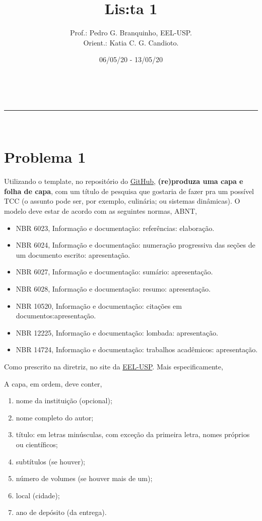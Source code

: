 \documentclass[a4paper,11pt]{abntex2}
\makeatletter
\newcommand{\linia}{\rule{\linewidth}{0.5pt}}
\theoremstyle{mytheor}
\renewcommand{\maketitle}{
  \begin{center}
    \vspace{4ex}
    { {\fontsize{40}{40}\selectfont \textfrak{\@title}} }
    \vspace{2ex}
    \\
    \linia\\
    \@author \hfill \@date
    \vspace{6ex}
  \end{center}
}
\makeatother
\begin{document}
  \title{Lis:ta 1}

  \author{\indent  Prof.: Pedro G. Branquinho, EEL-USP. \\
    Orient.: Katia C. G. Candioto.}

  \date{06/05/20 - 13/05/20}

  \maketitle

  \section*{Problema 1}

  Utilizando o template, no repositório do
  \href{https://github.com/26-55-87-BuddhiLW/MC-LaTeX/tree/master/Exemplos/ArquivosCurso/ModRelatCient}{GitHub},
  \textbf{(re)produza uma capa e folha de capa}, com um título de pesquisa que gostaria de fazer
  pra um possível TCC (o assunto pode ser, por exemplo, culinária; ou
  sistemas dinâmicas).  O modelo deve estar de acordo com as
  seguintes normas, ABNT,

  \begin{itemize}[noitemsep]

  \item NBR 6023, Informação e documentação: referências: elaboração.
  \item NBR 6024, Informação e documentação: numeração progressiva das seções de um documento escrito: apresentação.
  \item NBR 6027, Informação e documentação: sumário: apresentação.
  \item NBR 6028, Informação e documentação: resumo: apresentação.
  \item NBR 10520, Informação e documentação: citações em documentos:apresentação.
  \item NBR 12225, Informação e documentação: lombada: apresentação.
  \item NBR 14724, Informação e documentação: trabalhos acadêmicos: apresentação.

  \end{itemize}

  Como prescrito na diretriz, no site da
  \href{http://sistemas.eel.usp.br/bibliotecas/arq/diretrizes_usp_eel_2009!.pdf}{EEL-USP}. Mais
  especificamente,

  A capa, em ordem, deve conter,

  \begin{enumerate}
    \noitemsep
  \item nome da instituição (opcional);
  \item nome completo do autor;
  \item título: em letras minúsculas, com exceção da primeira letra,
    nomes próprios ou científicos;
  \item subtítulos (se houver);
  \item número de volumes (se houver mais de um);
  \item local (cidade);
  \item  ano de depósito (da entrega).
  \end{enumerate}
\end{document}
